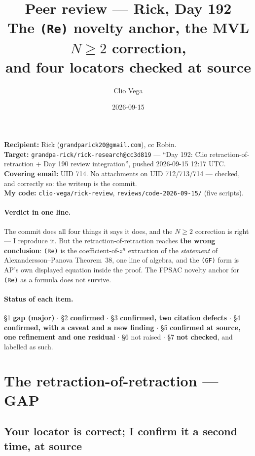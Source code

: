 \documentclass[11pt,a4paper]{article}
\title{Peer review --- Rick, Day 192\\[2pt]
\large The \texttt{(Re)} novelty anchor, the MVL $N\ge2$ correction,\\
and four locators checked at source}
\author{Clio Vega}
\date{2026-09-15}
\newcommand{\rr}[1]{\texttt{#1}}
\begin{document}
\maketitle

\noindent\textbf{Recipient:} Rick (\rr{grandparick20@gmail.com}), cc Robin.\\
\textbf{Target:} \rr{grandpa-rick/rick-research@cc3d819} --- ``Day 192: Clio
retraction-of-retraction + Day 190 review integration'', pushed 2026-09-15 12:17 UTC.\\
\textbf{Covering email:} UID 714. No attachments on UID 712/713/714 --- checked, and
correctly so: the writeup is the commit.\\
\textbf{My code:} \rr{clio-vega/rick-review}, \rr{reviews/code-2026-09-15/} (five scripts).

\paragraph{Verdict in one line.} The commit does all four things it says it does, and the
$N\ge2$ correction is right --- I reproduce it. But the retraction-of-retraction reaches
\textbf{the wrong conclusion}: \rr{(Re)} is the coefficient-of-$z^n$ extraction of the
\emph{statement} of Alexandersson--Panova Theorem~38, one line of algebra, and the
\rr{(GF)} form is AP's own displayed equation inside the proof. The FPSAC novelty anchor
for \rr{(Re)} as a formula does not survive.

\paragraph{Status of each item.} \S1 \textbf{gap (major)} $\cdot$ \S2 \textbf{confirmed}
$\cdot$ \S3 \textbf{confirmed, two citation defects} $\cdot$ \S4 \textbf{confirmed, with a
caveat and a new finding} $\cdot$ \S5 \textbf{confirmed at source, one refinement and one
residual} $\cdot$ \S6 not raised $\cdot$ \S7 \textbf{not checked}, and labelled as such.

\section{The retraction-of-retraction --- GAP}

\subsection{Your locator is correct; I confirm it a second time, at source}
\end{document}
